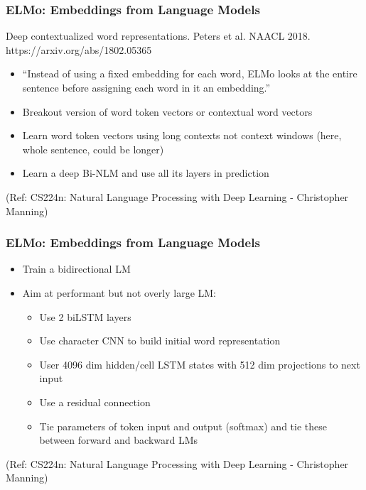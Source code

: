 \begin{frame}[fragile]\frametitle{ELMo: Embeddings from Language  Models}

Deep contextualized word representations. Peters et al. NAACL 2018.  https://arxiv.org/abs/1802.05365

\begin{itemize}
\item ``Instead of using a fixed embedding for each word, ELMo looks at the entire sentence before assigning each word in it an embedding.''
\item Breakout version of word token vectors or
contextual word vectors
\item Learn word token vectors using long contexts not context  windows (here, whole sentence, could be longer)
\item Learn a deep Bi-NLM and use all its layers in prediction
\end{itemize}

{\tiny (Ref: CS224n: Natural Language Processing with Deep Learning - Christopher Manning)}

\end{frame}

\begin{frame}[fragile]\frametitle{ELMo: Embeddings from Language  Models}

\begin{itemize}
\item Train a bidirectional LM
\item Aim at performant but not overly large LM:

\begin{itemize}
\item Use 2 biLSTM layers
\item Use character CNN to build initial word representation 
\item User 4096 dim hidden/cell LSTM states with 512 dim projections to next input
\item Use a residual connection
\item Tie parameters of token input and output (softmax) and tie these between forward and backward LMs
\end{itemize}

\end{itemize}

{\tiny (Ref: CS224n: Natural Language Processing with Deep Learning - Christopher Manning)}

\end{frame}

